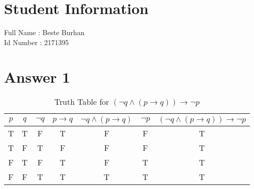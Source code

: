 \documentclass[12pt]{article}
\begin{document}
\section*{Student Information } 
Full Name : Beste Burhan \\
Id Number : 2171395 \\

\section*{Answer 1} 

\begin{table}[H]

\small
\centering
\caption{ Truth Table for  $(\neg q \wedge (p \rightarrow q)) \rightarrow \neg p$ }
\label{table:question 1/a}
\begin{tabular}{|c c|c|c|c|c|c|}	%
\hline 							%
\textbf{$p$} & \textbf{$q$} & \textbf{$\neg q$} & \textbf{$p \rightarrow q$} & \textbf{$\neg q \wedge (p \rightarrow q) $} & \textbf{$\neg p$} & \textbf{$(\neg q \wedge (p \rightarrow q)) \rightarrow \neg p$} \\
\hline 
\hline 
T & T & F & T & F & F & T\\			%
T & F & T & F & F & F & T\\
F & T & F & T & F & T & T\\
F & F & T & T & T & T & T\\
\hline 

\end{tabular}

\end{table}
\end{document}
